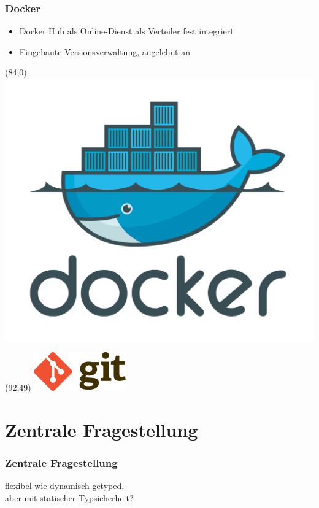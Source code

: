 \documentclass{beamer}
\begin{document}
\begin{frame}

\frametitle{Docker}

\begin{itemize}
\setlength{\itemsep}{20pt}
\item Docker Hub als Online-Dienst als Verteiler fest integriert
\item Eingebaute Versionsverwaltung, angelehnt an
\end{itemize}

\begin{textblock}{20}(84,0)
\includegraphics[scale=0.22]{docker.png}
\end{textblock}

\begin{textblock}{20}(92,49)
\includegraphics[scale=0.22]{gitlogo.png}
\end{textblock}

\end{frame}

\section{Zentrale Fragestellung}
\begin{frame}
\frametitle{Zentrale Fragestellung}

\centering
\glqq flexibel wie dynamisch getyped,\\ aber mit statischer Typsicherheit?\grqq{}

\end{frame}
\end{document}

